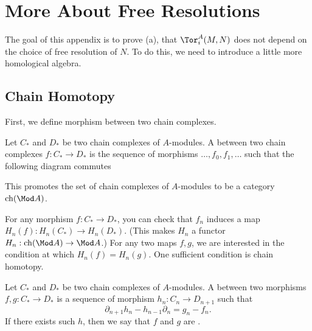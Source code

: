 \chapter{More About Free Resolutions}
The goal of this appendix is to prove
 (a),
that $\Tor_i^A(M,N)$ 
does not depend on the choice of free resolution of $N$.
To do this, we need to introduce a little more 
homological algebra.
\section{Chain Homotopy}
First, we define morphism between two chain complexes.
\begin{definition}
    Let $C_*$ and $D_*$ be two chain complexes of $A$-modules.
    A  between two chain complexes
    $f : C_*\to D_*$ is the sequence of morphisms
    $\dots, f_0, f_1,\dots$ such that the following diagram commutes
    \begin{center}
    \end{center}
    This promotes the set of chain complexes
    of $A$-modules to be a category $\operatorname{ch}(\Mod A)$.
\end{definition}
For any morphism $f : C_* \to D_*$,
you can check that $f_n$ induces a map
$H_n(f) : H_n(C_*) \to H_n(D_*)$.
(This makes $H_n$ a functor 
$H_n : \operatorname{ch}(\Mod A) \to \Mod A$.)
For any two maps $f,g$, we are interested
in the condition at which $H_n(f) = H_n(g)$.
One sufficient condition is chain homotopy.
\begin{definition}
    Let $C_*$ and $D_*$ be two chain complexes of $A$-modules.
    A  between two morphisms
    $f,g : C_*\to D_*$ is a sequence of morphism 
    $h_n : C_n \to D_{n+1}$ such that
    $$\partial_{n+1}h_n - h_{n-1}\partial_n = g_n-f_n.$$
    If there exists such $h$, then we say that
    $f$ and $g$ are .
\end{definition}
